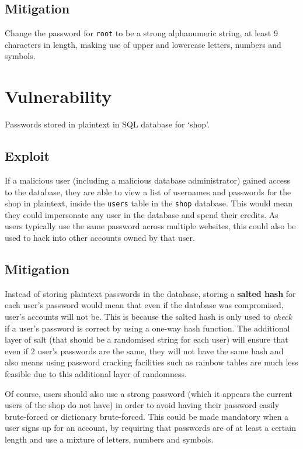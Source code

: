 \documentclass[11pt]{article}
\begin{document}
\subsection{Mitigation}

Change the password for \texttt{root} to be a strong alphanumeric string, at least 9 characters in length, making use of upper and lowercase letters, numbers and symbols.

\section{Vulnerability}

Passwords stored in plaintext in SQL database for `shop'.

\subsection{Exploit}

If a malicious user (including a malicious database administrator) gained access to the database, they are able to view a list of usernames and passwords for the shop in plaintext, inside the \texttt{users} table in the \texttt{shop} database. This would mean they could impersonate any user in the database and spend their credits. As users typically use the same password across multiple websites, this could also be used to hack into other accounts owned by that user.

\subsection{Mitigation}

Instead of storing plaintext passwords in the database, storing a \textbf{salted hash} for each user's password would mean that even if the database was compromised, user's accounts will not be. This is because the salted hash is only used to \textit{check} if a user's password is correct by using a one-way hash function. The additional layer of salt (that should be a randomised string for each user) will ensure that even if 2 user's passwords are the same, they will not have the same hash and also means using password cracking facilities such as rainbow tables are much less feasible due to this additional layer of randomness.

Of course, users should also use a strong password (which it appears the current users of the shop do not have) in order to avoid having their password easily brute-forced or dictionary brute-forced. This could be made mandatory when a user signs up for an account, by requiring that passwords are of at least a certain length and use a mixture of letters, numbers and symbols.
\end{document}
